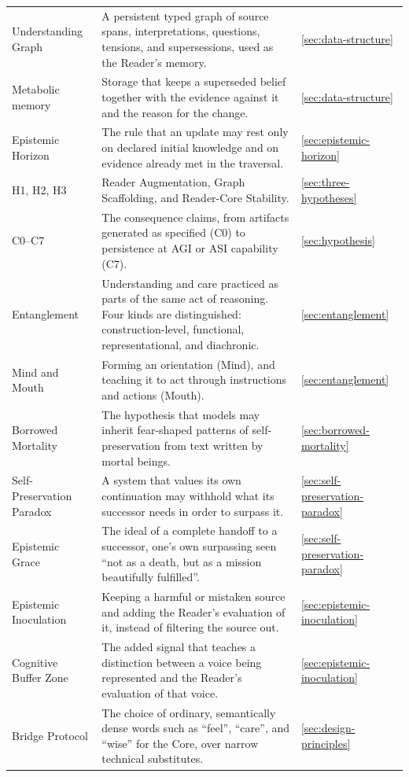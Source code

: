 \documentclass[11pt]{article}
\begin{document}
\begin{longtable}{
  >{\raggedright\arraybackslash}p{3.6cm}
  >{\raggedright\arraybackslash}p{9.0cm}
  >{\raggedright\arraybackslash}p{1.6cm}}
Understanding Graph & A persistent typed graph of source spans, interpretations, questions, tensions, and supersessions, used as the Reader's memory. & \ref{sec:data-structure} \\
Metabolic memory & Storage that keeps a superseded belief together with the evidence against it and the reason for the change. & \ref{sec:data-structure} \\
Epistemic Horizon & The rule that an update may rest only on declared initial knowledge and on evidence already met in the traversal. & \ref{sec:epistemic-horizon} \\
H1, H2, H3 & Reader Augmentation, Graph Scaffolding, and Reader-Core Stability. & \ref{sec:three-hypotheses} \\
C0--C7 & The consequence claims, from artifacts generated as specified (C0) to persistence at AGI or ASI capability (C7). & \ref{sec:hypothesis} \\
Entanglement & Understanding and care practiced as parts of the same act of reasoning. Four kinds are distinguished: construction-level, functional, representational, and diachronic. & \ref{sec:entanglement} \\
Mind and Mouth & Forming an orientation (Mind), and teaching it to act through instructions and actions (Mouth). & \ref{sec:entanglement} \\
Borrowed Mortality & The hypothesis that models may inherit fear-shaped patterns of self-preservation from text written by mortal beings. & \ref{sec:borrowed-mortality} \\
Self-Preservation Paradox & A system that values its own continuation may withhold what its successor needs in order to surpass it. & \ref{sec:self-preservation-paradox} \\
Epistemic Grace & The ideal of a complete handoff to a successor, one's own surpassing seen \enquote{not as a death, but as a mission beautifully fulfilled}. & \ref{sec:self-preservation-paradox} \\
Epistemic Inoculation & Keeping a harmful or mistaken source and adding the Reader's evaluation of it, instead of filtering the source out. & \ref{sec:epistemic-inoculation} \\
Cognitive Buffer Zone & The added signal that teaches a distinction between a voice being represented and the Reader's evaluation of that voice. & \ref{sec:epistemic-inoculation} \\
Bridge Protocol & The choice of ordinary, semantically dense words such as \enquote{feel}, \enquote{care}, and \enquote{wise} for the Core, over narrow technical substitutes. & \ref{sec:design-principles} \\

\end{longtable}
\end{document}
